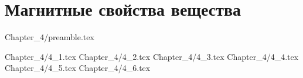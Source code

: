 \chapter{Магнитные свойства вещества}

 {Chapter_4/preamble.tex}

\newpage

 {Chapter_4/4_1.tex}
 {Chapter_4/4_2.tex}
 {Chapter_4/4_3.tex}
 {Chapter_4/4_4.tex}
 {Chapter_4/4_5.tex}
 {Chapter_4/4_6.tex}
